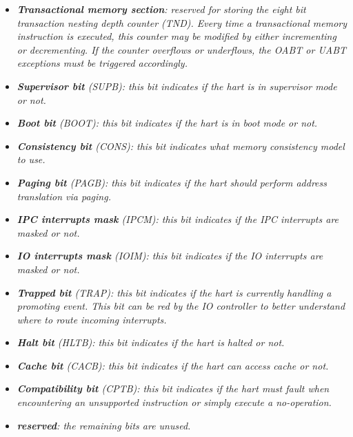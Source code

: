 \begin{itemize}
\begin{itemize}
                    \end{itemize}

                \item \textit{\textbf{Transactional memory section}: reserved for storing the eight bit transaction nesting depth counter (TND). Every time a transactional memory instruction is executed, this counter may be modified by either incrementing or decrementing. If the counter overflows or underflows, the OABT or UABT exceptions must be triggered accordingly.}

                \item \textit{\textbf{Supervisor bit} (SUPB): this bit indicates if the hart is in supervisor mode or not.}

                \item \textit{\textbf{Boot bit} (BOOT): this bit indicates if the hart is in boot mode or not.}

                \item \textit{\textbf{Consistency bit} (CONS): this bit indicates what memory consistency model to use.}

                \item \textit{\textbf{Paging bit} (PAGB): this bit indicates if the hart should perform address translation via paging.}

                \item \textit{\textbf{IPC interrupts mask} (IPCM): this bit indicates if the IPC interrupts are masked or not.}

                \item \textit{\textbf{IO interrupts mask} (IOIM): this bit indicates if the IO interrupts are masked or not.}

                \item \textit{\textbf{Trapped bit} (TRAP): this bit indicates if the hart is currently handling a promoting event. This bit can be red by the IO controller to better understand where to route incoming interrupts.}

                \item \textit{\textbf{Halt bit} (HLTB): this bit indicates if the hart is halted or not.}

                \item \textit{\textbf{Cache bit} (CACB): this bit indicates if the hart can access cache or not.}

                \item \textit{\textbf{Compatibility bit} (CPTB): this bit indicates if the hart must fault when encountering an unsupported instruction or simply execute a no-operation.}

                \item \textit{\textbf{reserved}: the remaining bits are unused.}

            \end{itemize}


